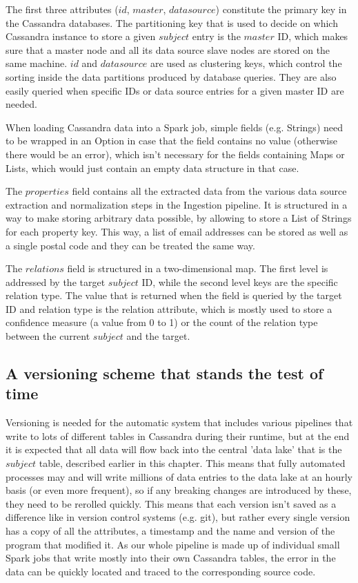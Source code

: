 \documentclass[
  a4paper,     %
  titlepage,   %
  oneside,     %
  parskip      %
]{scrartcl}          %
\begin{document}
    The first three attributes ($id$, $master$, $datasource$) constitute the
    primary key in the Cassandra databases.
    The partitioning key that is used to decide on which Cassandra instance to store
    a given $subject$ entry is the $master$ ID, which makes sure that a master node
    and all its data source slave nodes are stored on the same machine.
    $id$ and $datasource$ are used as clustering keys, which control the sorting
    inside the data partitions produced by database queries. They are also easily
    queried when specific IDs or data source entries for a given master ID are
    needed.

    When loading Cassandra data into a Spark job, simple fields (e.g. Strings)
    need to be wrapped in an Option in case that the field contains no value
    (otherwise there would be an error), which isn't necessary for the fields
    containing Maps or Lists, which would just contain an empty data structure
    in that case.

    The $properties$ field contains all the extracted data from the various
    data source extraction and normalization steps in the Ingestion pipeline.
    It is structured in a way to make storing arbitrary data possible, by allowing
    to store a List of Strings for each property key. This way, a list of
    email addresses can be stored as well as a single postal code and they can
    be treated the same way.

    The $relations$ field is structured in a two-dimensional map. The first level
    is addressed by the target $subject$ ID, while the second level keys are the
    specific relation type. The value that is returned when the field is queried
    by the target ID and relation type is the relation attribute, which is mostly
    used to store a confidence measure (a value from 0 to 1) or the count of the
    relation type between the current $subject$ and the target.

    \subsection{A versioning scheme that stands the test of time}
    Versioning is needed for the automatic system that includes various pipelines
    that write to lots of different tables in Cassandra during their runtime,
    but at the end it is expected that all data will flow back into the central
    'data lake' that is the $subject$ table, described earlier in this chapter.
    This means that fully automated processes may and will write millions of
    data entries to the data lake at an hourly basis (or even more frequent),
    so if any breaking changes are introduced by these, they need to be rerolled quickly.
    This means that each version isn't saved as a difference like in version control systems
    (e.g. git), but rather every single version has a copy of all the attributes,
    a timestamp and the name and version of the program that modified it.
    As our whole pipeline is made up of individual small Spark jobs that write
    mostly into their own Cassandra tables, the error in the data can be quickly
    located and traced to the corresponding source code.
\end{document}
